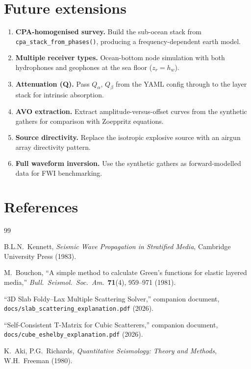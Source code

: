 \documentclass[11pt,a4paper]{article}
\begin{document}
\section{Future extensions}
\label{sec:future}

\begin{enumerate}
  \item \textbf{CPA-homogenised survey.}  Build the sub-ocean stack
    from \texttt{cpa\_stack\_from\_phases()}, producing a
    frequency-dependent earth model.

  \item \textbf{Multiple receiver types.}  Ocean-bottom node
    simulation with both hydrophones and geophones at the sea floor
    ($z_r = h_w$).

  \item \textbf{Attenuation (Q).}  Pass $Q_\alpha$, $Q_\beta$ from
    the YAML config through to the layer stack for intrinsic
    absorption.

  \item \textbf{AVO extraction.}  Extract amplitude-versus-offset
    curves from the synthetic gathers for comparison with
    Zoeppritz equations.

  \item \textbf{Source directivity.}  Replace the isotropic
    explosive source with an airgun array directivity pattern.

  \item \textbf{Full waveform inversion.}  Use the synthetic
    gathers as forward-modelled data for FWI benchmarking.
\end{enumerate}

\section{References}

\begin{thebibliography}{99}

B.L.N.\ Kennett,
\emph{Seismic Wave Propagation in Stratified Media},
Cambridge University Press (1983).

M.\ Bouchon,
``A simple method to calculate Green's functions for elastic
layered media,''
\emph{Bull.\ Seismol.\ Soc.\ Am.}\ \textbf{71}(4), 959--971 (1981).

``3D Slab Foldy--Lax Multiple Scattering Solver,''
companion document,
\texttt{docs/slab\_scattering\_explanation.pdf} (2026).

``Self-Consistent T-Matrix for Cubic Scatterers,''
companion document,
\texttt{docs/cube\_eshelby\_explanation.pdf} (2026).

K.\ Aki, P.G.\ Richards,
\emph{Quantitative Seismology: Theory and Methods},
W.H.\ Freeman (1980).

\end{thebibliography}
\end{document}
